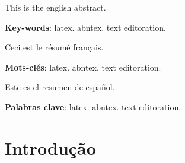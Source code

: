 \documentclass[12pt,openright,twoside,a4paper]{abntex2}
\begin{document}
\begin{resumo}[Abstract]
 This is the english abstract.

 \vspace{\onelineskip}
 
 \noindent 
 \textbf{Key-words}: latex. abntex. text editoration.
\end{resumo}

\begin{resumo}[Résumé]
  Ceci est le résumé français.
 
 \vspace{\onelineskip}
 
 \noindent
 \textbf{Mots-clés}: latex. abntex. text editoration.
\end{resumo}

\begin{resumo}[Resumen]
  Este es el resumen de español.
  
 \vspace{\onelineskip}
 
 \noindent
 \textbf{Palabras clave}: latex. abntex. text editoration.
\end{resumo}

\listoffigures*
\cleardoublepage

\listoftables*
\cleardoublepage



\tableofcontents*
\cleardoublepage




\addcontentsline{}{}{}
\chapter*{Introdução}
\end{document}
